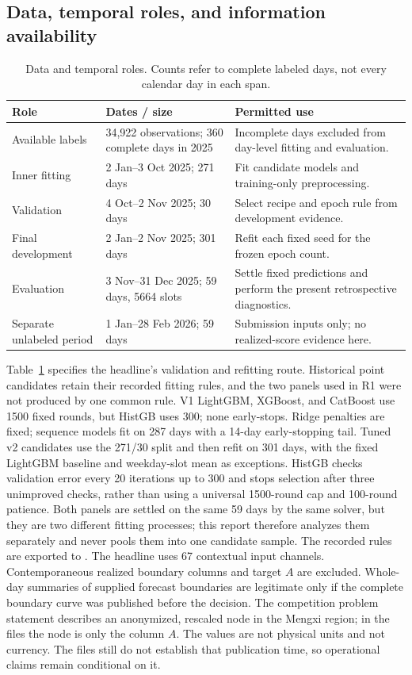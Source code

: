 \documentclass[11pt,a4paper]{article}
\begin{document}
\subsection{Data, temporal roles, and information availability}
\begin{table}[!htbp]\centering\small
\caption{Data and temporal roles. Counts refer to complete labeled days, not every calendar day in each span.}\label{tab:data}
\begin{tabularx}{\linewidth}{@{}p{.19\linewidth}p{.28\linewidth}X@{}}\toprule
Role & Dates / size & Permitted use \\\midrule
Available labels & 34,922 observations; 360 complete days in 2025 & Incomplete days excluded from day-level fitting and evaluation. \\
Inner fitting & 2 Jan--3 Oct 2025; 271 days & Fit candidate models and training-only preprocessing. \\
Validation & 4 Oct--2 Nov 2025; 30 days & Select recipe and epoch rule from development evidence. \\
Final development & 2 Jan--2 Nov 2025; 301 days & Refit each fixed seed for the frozen epoch count. \\
Evaluation & 3 Nov--31 Dec 2025; 59 days, 5664 slots & Settle fixed predictions and perform the present retrospective diagnostics. \\
Separate unlabeled period & 1 Jan--28 Feb 2026; 59 days & Submission inputs only; no realized-score evidence here. \\\bottomrule
\end{tabularx}\end{table}

Table~\ref{tab:data} specifies the headline's validation and refitting route. Historical point candidates retain their recorded fitting rules, and the two panels used in R1 were not produced by one common rule. V1 LightGBM, XGBoost, and CatBoost use 1500 fixed rounds, but HistGB uses 300; none early-stops. Ridge penalties are fixed; sequence models fit on 287 days with a 14-day early-stopping tail. Tuned v2 candidates use the 271/30 split and then refit on 301 days, with the fixed LightGBM baseline and weekday-slot mean as exceptions. HistGB checks validation error every 20 iterations up to 300 and stops selection after three unimproved checks, rather than using a universal 1500-round cap and 100-round patience. Both panels are settled on the same 59 days by the same solver, but they are two different fitting processes; this report therefore analyzes them separately and never pools them into one candidate sample. The recorded rules are exported to . The headline uses 67 contextual input channels. Contemporaneous realized boundary columns and target $A$ are excluded. Whole-day summaries of supplied forecast boundaries are legitimate only if the complete boundary curve was published before the decision. The competition problem statement describes an anonymized, rescaled node in the Mengxi region; in the files the node is only the column $A$. The values are not physical units and not currency. The files still do not establish that publication time, so operational claims remain conditional on it.
\end{document}
